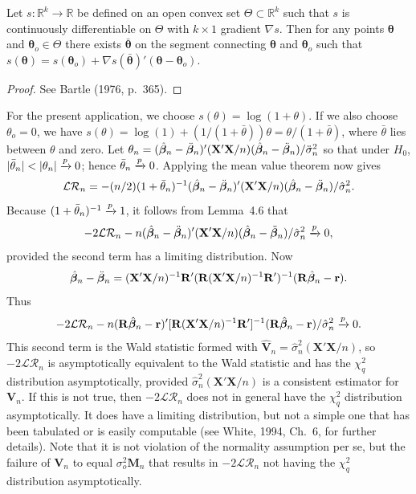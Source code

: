\begin{theorem}\label{thm:4.36}
Let $s : \mathbb{R}^k \to \mathbb{R}$ be defined on an open convex set $\Theta \subset \mathbb{R}^k$ such that $s$ is continuously differentiable on $\Theta$ with $k \times 1$ gradient $\nabla s$. Then for any points $\boldsymbol{\theta}$ and $\boldsymbol{\theta}_o \in \Theta$ there exists $\bar{\boldsymbol{\theta}}$ on the segment connecting $\boldsymbol{\theta}$ and $\boldsymbol{\theta}_o$ such that $s(\boldsymbol{\theta}) = s(\boldsymbol{\theta}_o) + \nabla s(\bar{\boldsymbol{\theta}})'(\boldsymbol{\theta} - \boldsymbol{\theta}_o)$.
\end{theorem}

\begin{proof}
See Bartle (1976, p.~365).
\end{proof}

For the present application, we choose $s(\theta) = \log(1+\theta)$. If we also choose
$\theta_o = 0$, we have $s(\theta) = \log(1)+(1/(1+\bar{\theta}))\theta = \theta/(1+\bar{\theta})$, where $\bar{\theta}$ lies between
$\theta$ and zero. Let $\theta_n = (\hat{\boldsymbol{\beta}}_n - \ddot{\boldsymbol{\beta}}_n)'(\mathbf{X}'\mathbf{X}/n)(\hat{\boldsymbol{\beta}}_n - \ddot{\boldsymbol{\beta}}_n)/\ddot{\sigma}_n^2$ so that under $H_0$,
$|\bar{\theta}_n| < |\theta_n| \xrightarrow{p} 0$; hence $\bar{\theta}_n \xrightarrow{p} 0$. Applying the mean value theorem now
gives
\[
\mathcal{LR}_n = -(n/2)(1+\bar{\theta}_n)^{-1}(\hat{\boldsymbol{\beta}}_n - \ddot{\boldsymbol{\beta}}_n)'(\mathbf{X}'\mathbf{X}/n)(\hat{\boldsymbol{\beta}}_n - \ddot{\boldsymbol{\beta}}_n)/\hat{\sigma}_n^2.
\]
Because $(1+\bar{\theta}_n)^{-1} \xrightarrow{p} 1$, it follows from Lemma~4.6 that
\[
-2\mathcal{LR}_n - n(\hat{\boldsymbol{\beta}}_n - \ddot{\boldsymbol{\beta}}_n)'(\mathbf{X}'\mathbf{X}/n)(\hat{\boldsymbol{\beta}}_n - \ddot{\boldsymbol{\beta}}_n)/\hat{\sigma}_n^2 \xrightarrow{p} 0,
\]
provided the second term has a limiting distribution. Now
\[
\hat{\boldsymbol{\beta}}_n - \ddot{\boldsymbol{\beta}}_n = (\mathbf{X}'\mathbf{X}/n)^{-1}\mathbf{R}'(\mathbf{R}(\mathbf{X}'\mathbf{X}/n)^{-1}\mathbf{R}')^{-1}(\mathbf{R}\hat{\boldsymbol{\beta}}_n - \mathbf{r}).
\]
Thus
\[
-2\mathcal{LR}_n - n(\mathbf{R}\hat{\boldsymbol{\beta}}_n - \mathbf{r})'[\mathbf{R}(\mathbf{X}'\mathbf{X}/n)^{-1}\mathbf{R}']^{-1}(\mathbf{R}\hat{\boldsymbol{\beta}}_n - \mathbf{r})/\hat{\sigma}_n^2 \xrightarrow{p} 0.
\]
This second term is the Wald statistic formed with $\hat{\mathbf{V}}_n = \hat{\sigma}_n^2(\mathbf{X}'\mathbf{X}/n)$, so
$-2\mathcal{LR}_n$ is asymptotically equivalent to the Wald statistic and has the $\chi_q^2$
distribution asymptotically, provided $\hat{\sigma}_n^2(\mathbf{X}'\mathbf{X}/n)$ is a consistent estimator
for $\mathbf{V}_n$. If this is not true, then $-2\mathcal{LR}_n$ does not in general have the $\chi_q^2$
distribution asymptotically. It does have a limiting distribution, but not a
simple one that has been tabulated or is easily computable (see White, 1994,
Ch.~6, for further details). Note that it is not violation of the normality
assumption per se, but the failure of $\mathbf{V}_n$ to equal $\sigma_o^2\mathbf{M}_n$ that results in
$-2\mathcal{LR}_n$ not having the $\chi_q^2$ distribution asymptotically.

